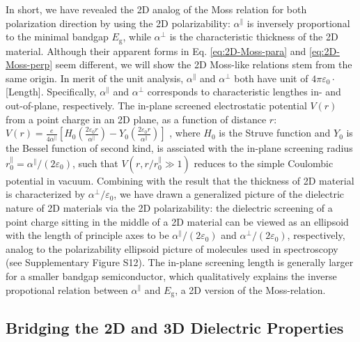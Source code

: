 \documentclass[journal=ancac3,manuscript=article,email=true,hyperref=true,keywords=false]{achemso}
\begin{document}
In short, we have revealed the 2D analog of the Moss relation for both
polarization direction by using the 2D polarizability:
$\alpha^{\parallel}$ is inversely proportional to the minimal bandgap
$E_{\mathrm{g}}$, while $\alpha^{\perp}$ is the characteristic
thickness of the 2D material. Although their apparent forms in
Eq. \ref{eq:2D-Moss-para} and \ref{eq:2D-Moss-perp} seem different, we
will show the 2D Moss-like relations stem from the same origin. In
merit of the unit analysis, $\alpha^{\parallel}$ and $\alpha^{\perp}$
both have unit of $4\pi\varepsilon_{0} \cdot$[Length]. Specifically,
$\alpha^{\parallel}$ and $\alpha^{\perp}$ corresponds to
characteristic lengthes in- and out-of-plane, respectively. The
in-plane screened electrostatic potential $V(r)$ from a point charge
in an 2D plane, as a function of distance $r$:
$V(r) = {\displaystyle \frac{e}{4 \alpha^{\parallel}}}
\left[H_{0}({\displaystyle \frac{2\varepsilon_{0}
      r}{\alpha^{\parallel}}}) - Y_{0}( {\displaystyle \frac{2
      \varepsilon_{0}r}{\alpha^{\parallel}}})\right]$
\cite{Keldysh_1979_eps_multi,Pulci_2014}, where $H_{0}$ is the Struve
function and $Y_{0}$ is the Bessel function of second kind, is
assciated with the in-plane screening radius
$r_{0}^{\parallel}=\alpha^{\parallel}/(2 \varepsilon_{0})$, such that
$V(r,r/r^{\parallel}_{0} \gg 1)$ reduces to the simple Coulombic
potential in vacuum. Combining with the result that the thickness of
2D material is characterized by $\alpha^{\perp}/\varepsilon_{0}$, we
have drawn a generalized picture of the dielectric nature of 2D
materials via the 2D polarizability: the dielectric screening of a
point charge sitting in the middle of a 2D material can be viewed as
an ellipsoid with the length of principle axes to be
$\alpha^{\parallel}/(2 \varepsilon_{0})$ and
$\alpha^{\perp}/(2 \varepsilon_{0})$, respectively, analog to the
polarizability ellipsoid picture of molecules used in spectroscopy
\cite{Banwell_1994} (see Supplementary Figure S12). The in-plane
screening length is generally larger for a smaller bandgap
semiconductor, which qualitatively explains the inverse propotional
relation between $\alpha^{\parallel}$ and $E_{\mathrm{g}}$, a 2D
version of the Moss-relation.


\subsection{Bridging the 2D and 3D Dielectric Properties}
\label{sec:2D-3D}
\end{document}
